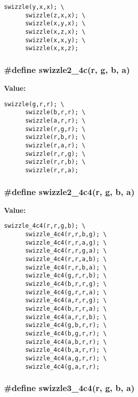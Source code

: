 \footnotesize\begin{verbatim}swizzle(y,x,x); \
      swizzle(z,x,x); \
      swizzle(x,y,x); \
      swizzle(x,z,x); \
      swizzle(x,x,y); \
      swizzle(x,x,z);
\end{verbatim}\normalsize 
{}
\subsubsection{\setlength{\rightskip}{0pt plus 5cm}\#define swizzle2\_\-4c(r, g, b, a)}\label{mrSwizzle_8h_a4}


{\bf Value:}

\footnotesize\begin{verbatim}swizzle(g,r,r); \
      swizzle(b,r,r); \
      swizzle(a,r,r); \
      swizzle(r,g,r); \
      swizzle(r,b,r); \
      swizzle(r,a,r); \
      swizzle(r,r,g); \
      swizzle(r,r,b); \
      swizzle(r,r,a);
\end{verbatim}\normalsize 
{}
\subsubsection{\setlength{\rightskip}{0pt plus 5cm}\#define swizzle2\_\-4c4(r, g, b, a)}\label{mrSwizzle_8h_a9}


{\bf Value:}

\footnotesize\begin{verbatim}swizzle_4c4(r,r,g,b); \
      swizzle_4c4(r,r,b,g); \
      swizzle_4c4(r,r,a,g); \
      swizzle_4c4(r,r,g,a); \
      swizzle_4c4(r,r,a,b); \
      swizzle_4c4(r,r,b,a); \
      swizzle_4c4(g,r,r,b); \
      swizzle_4c4(b,r,r,g); \
      swizzle_4c4(g,r,r,a); \
      swizzle_4c4(a,r,r,g); \
      swizzle_4c4(b,r,r,a); \
      swizzle_4c4(a,r,r,b); \
      swizzle_4c4(g,b,r,r); \
      swizzle_4c4(b,g,r,r); \
      swizzle_4c4(a,b,r,r); \
      swizzle_4c4(b,a,r,r); \
      swizzle_4c4(a,g,r,r); \
      swizzle_4c4(g,a,r,r);
\end{verbatim}\normalsize 
{}
\subsubsection{\setlength{\rightskip}{0pt plus 5cm}\#define swizzle3\_\-4c4(r, g, b, a)}\label{mrSwizzle_8h_a8}



